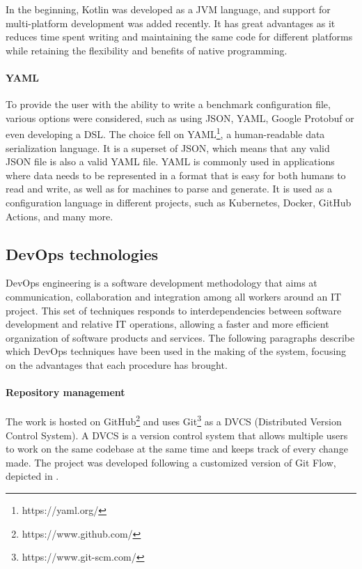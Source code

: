 \documentclass[12pt,a4paper,openright,twoside]{book}
\begin{document}
In the beginning, Kotlin was developed as a JVM language, and support for multi-platform development was added recently. 
It has great advantages as it reduces time spent writing and maintaining the same code for different platforms while retaining the flexibility and benefits of native programming.

\paragraph*{YAML}
To provide the user with the ability to write a benchmark configuration file, various options were considered, such as using JSON, YAML, Google Protobuf or even developing a DSL. 
The choice fell on YAML\footnote{https://yaml.org/}, a human-readable data serialization language. It is a superset of JSON, which means that any valid JSON file is also a valid YAML file.
YAML is commonly used in applications where data needs to be represented in a format that is easy for both humans to read and write, as well as for machines to parse and generate.
It is used as a configuration language in different projects, such as Kubernetes, Docker, GitHub Actions, and many more.

\subsection{DevOps technologies}
DevOps engineering is a software development methodology that aims at communication, collaboration and integration among all workers around an IT project. 
This set of techniques responds to interdependencies between software development and relative IT operations, allowing a faster and more efficient organization of software products and services.
The following paragraphs describe which DevOps techniques have been used in the making of the system, focusing on the advantages that each procedure has brought.

\paragraph*{Repository management}
The work is hosted on GitHub\footnote{https://www.github.com/} and uses Git\footnote{https://www.git-scm.com/} as a DVCS (Distributed Version Control System).
A DVCS is a version control system that allows multiple users to work on the same codebase at the same time and keeps track of every change made.
The project was developed following a customized version of Git Flow, depicted in . 
\end{document}
